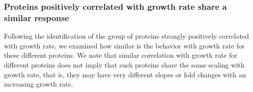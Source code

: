 \subsubsection{Proteins positively correlated with growth rate share a similar response}
\label{propchange} 

Following the identification of the group of proteins strongly positively correlated with growth rate, we examined how similar is the behavior with growth rate for these different proteins.
We note that similar correlation with growth rate for different proteins does not imply that such proteins share the same scaling with growth rate, that is,  they may have very different slopes or fold changes with an increasing growth rate.